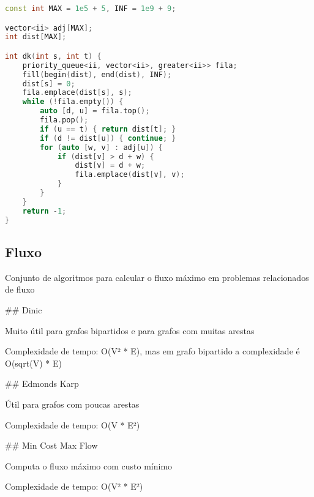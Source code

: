 \documentclass[11pt, a4paper, twoside]{article}
\begin{document}
\begin{multicols}{2}
\begin{lstlisting}[language=C++]
const int MAX = 1e5 + 5, INF = 1e9 + 9;

vector<ii> adj[MAX];
int dist[MAX];

int dk(int s, int t) {
    priority_queue<ii, vector<ii>, greater<ii>> fila;
    fill(begin(dist), end(dist), INF);
    dist[s] = 0;
    fila.emplace(dist[s], s);
    while (!fila.empty()) {
        auto [d, u] = fila.top();
        fila.pop();
        if (u == t) { return dist[t]; }
        if (d != dist[u]) { continue; }
        for (auto [w, v] : adj[u]) {
            if (dist[v] > d + w) {
                dist[v] = d + w;
                fila.emplace(dist[v], v);
            }
        }
    }
    return -1;
}
\end{lstlisting}
\end{multicols}

\subsection{Fluxo}


Conjunto de algoritmos para calcular o fluxo máximo em problemas relacionados de fluxo

\#\# Dinic

Muito útil para grafos bipartidos e para grafos com muitas arestas

Complexidade de tempo: O(V² * E), mas em grafo bipartido a complexidade é O(sqrt(V) * E)

\#\# Edmonds Karp

Útil para grafos com poucas arestas

Complexidade de tempo: O(V * E²)

\#\# Min Cost Max Flow

Computa o fluxo máximo com custo mínimo

Complexidade de tempo: O(V² * E²)
\end{document}
